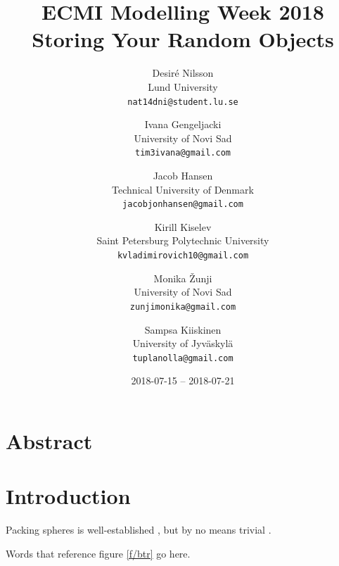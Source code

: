 \documentclass[12pt, sumlimits, intlimits]{article}
\title{ECMI Modelling Week 2018 \\ Storing Your Random Objects}
\author{Desiré Nilsson \\ Lund University \\
\texttt{nat14dni@student.lu.se} \and
Ivana Gengeljacki \\ University of Novi Sad \\
\texttt{tim3ivana@gmail.com} \and
Jacob Hansen \\ Technical University of Denmark \\
\texttt{jacobjonhansen@gmail.com} \and
Kirill Kiselev \\ Saint Petersburg Polytechnic University \\
\texttt{kvladimirovich10@gmail.com} \and
Monika Žunji \\ University of Novi Sad \\
\texttt{zunjimonika@gmail.com} \and
Sampsa Kiiskinen \\ University of Jyväskylä \\
\texttt{tuplanolla@gmail.com}}
\date{2018-07-15 -- 2018-07-21}
\begin{document}
\maketitle

\section*{Abstract}

\section{Introduction}

Packing spheres is well-established \cite{conway-1998},
but by no means trivial \cite{torquato-2000}.

Words that reference figure \ref{f/btr} go here.
\end{document}
